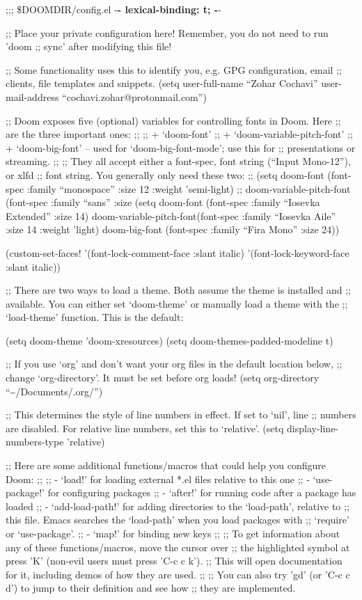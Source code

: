 \documentclass[11pt]{article}
\author{Zohar Cochavi}
\date{\today}
\title{}
\begin{document}
\tableofcontents

;;; \$DOOMDIR/config.el -\textbf{- lexical-binding: t; -}-

;; Place your private configuration here! Remember, you do not need to run 'doom
;; sync' after modifying this file!


;; Some functionality uses this to identify you, e.g. GPG configuration, email
;; clients, file templates and snippets.
(setq user-full-name ``Zohar Cochavi''
      user-mail-address ``cochavi.zohar@protonmail.com'')

;; Doom exposes five (optional) variables for controlling fonts in Doom. Here
;; are the three important ones:
;;
;; + `doom-font'
;; + `doom-variable-pitch-font'
;; + `doom-big-font' -- used for `doom-big-font-mode'; use this for
;;   presentations or streaming.
;;
;; They all accept either a font-spec, font string (``Input Mono-12''), or xlfd
;; font string. You generally only need these two:
;; (setq doom-font (font-spec :family ``monospace'' :size 12 :weight 'semi-light)
;;       doom-variable-pitch-font (font-spec :family ``sans'' :size
(setq doom-font (font-spec :family ``Iosevka Extended'' :size 14)
      doom-variable-pitch-font(font-spec :family ``Iosevka Aile'' :size 14 :weight 'light)
      doom-big-font (font-spec :family ``Fira Mono'' :size 24))

(custom-set-faces!
  '(font-lock-comment-face :slant italic)
  '(font-lock-keyword-face :slant italic))

;; There are two ways to load a theme. Both assume the theme is installed and
;; available. You can either set `doom-theme' or manually load a theme with the
;; `load-theme' function. This is the default:

(setq doom-theme 'doom-xresources)
(setq doom-themes-padded-modeline t)


;; If you use `org' and don't want your org files in the default location below,
;; change `org-directory'. It must be set before org loads!
(setq org-directory ``\textasciitilde{}/Documents/.org/'')

;; This determines the style of line numbers in effect. If set to `nil', line
;; numbers are disabled. For relative line numbers, set this to `relative'.
(setq display-line-numbers-type 'relative)

;; Here are some additional functions/macros that could help you configure Doom:
;;
;; - `load!' for loading external *.el files relative to this one
;; - `use-package!' for configuring packages
;; - `after!' for running code after a package has loaded
;; - `add-load-path!' for adding directories to the `load-path', relative to
;;   this file. Emacs searches the `load-path' when you load packages with
;;   `require' or `use-package'.
;; - `map!' for binding new keys
;;
;; To get information about any of these functions/macros, move the cursor over
;; the highlighted symbol at press 'K' (non-evil users must press 'C-c c k').
;; This will open documentation for it, including demos of how they are used.
;;
;; You can also try 'gd' (or 'C-c c d') to jump to their definition and see how
;; they are implemented.
\end{document}
